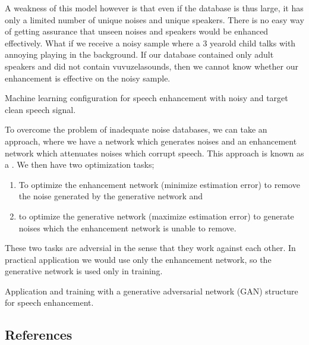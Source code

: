 \documentclass[letterpaper,10pt,english]{jupyterBook}
\begin{document}
\sphinxAtStartPar
A weakness of this model however is that even if the database is thus
large, it has only a limited number of unique noises and unique
speakers. There is no easy way of getting assurance that unseen noises
and speakers would be enhanced effectively. What if we receive a noisy
sample where a 3 year\sphinxhyphen{}old child talks with annoying
 playing in the
background. If our database contained only adult speakers and did not
contain vuvuzela\sphinxhyphen{}sounds, then we cannot know whether our enhancement is
effective on the noisy sample.

\sphinxAtStartPar
Machine learning configuration for speech enhancement with noisy and
target clean speech signal.

\sphinxAtStartPar
{}

\sphinxAtStartPar
To overcome the problem of inadequate noise databases, we can take an
 approach, where we have a  network which
generates noises and an enhancement network which attenuates noises
which corrupt speech. This approach is known as a . We then have two optimization tasks;
\begin{enumerate}
%
\item {} 
\sphinxAtStartPar
To optimize the enhancement network (minimize estimation error) to
remove the noise generated by the generative network and

\item {} 
\sphinxAtStartPar
to optimize the generative network (maximize estimation error) to
generate noises which the enhancement network is unable to remove.

\end{enumerate}

\sphinxAtStartPar
These two tasks are adversial in the sense that they work against each
other. In practical application we would use only the enhancement
network, so the generative network is used only in training.

\sphinxAtStartPar
Application and training with a generative adversarial network (GAN)
structure for speech enhancement.

\sphinxAtStartPar
{}


\subsection{References}
\label{\detokenize{Enhancement/Noise_attenuation:references}}
\sphinxstepscope
\end{document}
